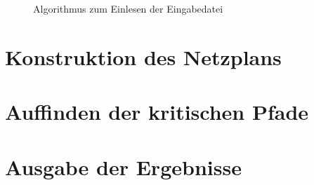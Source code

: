\begin{figure}[h]
  
  \caption{Algorithmus zum Einlesen der Eingabedatei}
  \label{einlesen}
\end{figure}

\section{Konstruktion des Netzplans}

\section{Auffinden der kritischen Pfade}

\section{Ausgabe der Ergebnisse}
